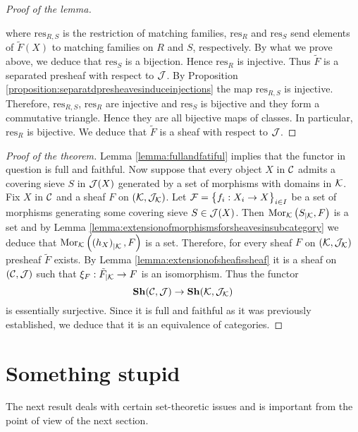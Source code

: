 \begin{proof}[Proof of the lemma]
\begin{center}
\end{center}
where $\mathrm{res}_{R,S}$ is the restriction of matching families, $\mathrm{res}_{R}$ and $\mathrm{res}_{S}$ send elements of $\tilde{F}(X)$ to matching families on $R$ and $S$, respectively. By what we prove above, we deduce that $\mathrm{res}_S$ is a bijection. Hence $\mathrm{res}_R$ is injective. Thus $\tilde{F}$ is a separated presheaf with respect to ${\mathcal J}$. By Proposition \ref{proposition:separatdpresheavesinduceinjections} the map $\mathrm{res}_{R,S}$ is injective. Therefore, $\mathrm{res}_{R,S}$, $\mathrm{res}_R$ are injective and $\mathrm{res}_S$ is bijective and they form a commutative triangle. Hence they are all bijective maps of classes. In particular, $\mathrm{res}_R$ is bijective. We deduce that $\tilde{F}$ is a sheaf with respect to ${\mathcal J}$.
\end{proof}

\begin{proof}[Proof of the theorem]
Lemma \ref{lemma:fullandfatiful} implies that the functor in question is full and faithful. Now suppose that every object $X$ in ${\mathcal C}$ admits a covering sieve $S$ in ${\mathcal J}(X)$ generated by a set of morphisms with domains in ${\mathcal K}$. Fix $X$ in ${\mathcal C}$ and a sheaf $F$ on $\left({\mathcal K},{\mathcal J}_{{\mathcal K}}\right)$. Let ${\mathcal F} = \big\{f_i:X_i\rightarrow X\big\}_{i\in I}$ be a set of morphisms generating some covering sieve $S\in {\mathcal J}(X)$. Then $\mathrm{Mor}_{{\mathcal K}}\left(S_{\mid {\mathcal K}},F\right)$ is a set and by Lemma \ref{lemma:extensionofmorphismsforsheavesinsubcategory} we deduce that $\mathrm{Mor}_{{\mathcal K}}\left(\left(h_X\right)_{\mid {\mathcal K}},F\right)$ is a set. Therefore, for every sheaf $F$ on $\left({\mathcal K},{\mathcal J}_{{\mathcal K}}\right)$ presheaf $\tilde{F}$ exists. By Lemma \ref{lemma:extensionofsheafissheaf} it is a sheaf on $\left({\mathcal C},{\mathcal J}\right)$ such that $\xi_{F}:\tilde{F}_{\mid {\mathcal K}}\rightarrow F$ is an isomorphism. Thus the functor
$$\mathbf{Sh}({\mathcal C},{\mathcal J})\rightarrow \mathbf{Sh}({\mathcal K},{\mathcal J}_{{\mathcal K}})$$
is essentially surjective. Since it is full and faithful as it was previously established, we deduce that it is an equivalence of categories.
\end{proof}

\section{Something stupid}
\noindent
The next result deals with certain set-theoretic issues and is important from the point of view of the next section.

